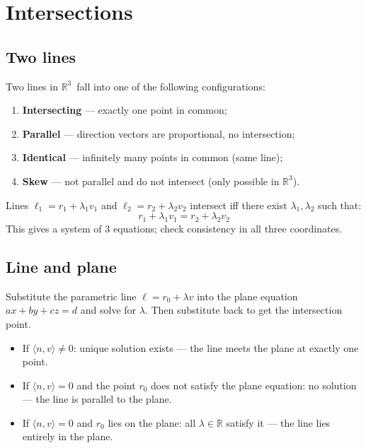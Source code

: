\documentclass[11pt]{article}
\theoremstyle{plain}
\theoremstyle{definition}
\newcommand{\R}{\mathbb{R}}
\newcommand{\rthree}{$\R^3$}
\begin{document}
\section{Intersections}

\subsection{Two lines}

Two lines in \rthree\ fall into one of the following configurations:
\begin{enumerate}[label=\roman*.]
    \item \textbf{Intersecting} — exactly one point in common;
    \item \textbf{Parallel} — direction vectors are proportional, no intersection;
    \item \textbf{Identical} — infinitely many points in common (same line);
    \item \textbf{Skew} — not parallel and do not intersect (only possible in \rthree).
\end{enumerate}

Lines $\ell_1 = r_1 + \lambda_1 v_1$ and
$\ell_2 = r_2 + \lambda_2 v_2$ intersect iff there exist
$\lambda_1, \lambda_2$ such that:
\[
r_1 + \lambda_1 v_1 = r_2 + \lambda_2 v_2
\]
This gives a system of 3 equations; check consistency in all three coordinates.

\subsection{Line and plane}

Substitute the parametric line $\ell = r_0 + \lambda v$ into the plane equation 
$ax + by + cz = d$ and solve for $\lambda$. Then substitute back to get the intersection point.  

\begin{itemize}[label={$\rightarrow$}]
    \item If $\langle n, v \rangle \neq 0$: unique solution exists — the line meets the plane at exactly one point.
    \item If $\langle n, v \rangle = 0$ and the point $r_0$ does not satisfy the plane equation: no solution — the line is parallel to the plane.
    \item If $\langle n, v \rangle = 0$ and $r_0$ lies on the plane: all $\lambda \in \R$ satisfy it — the line lies entirely in the plane.
\end{itemize}
\end{document}
